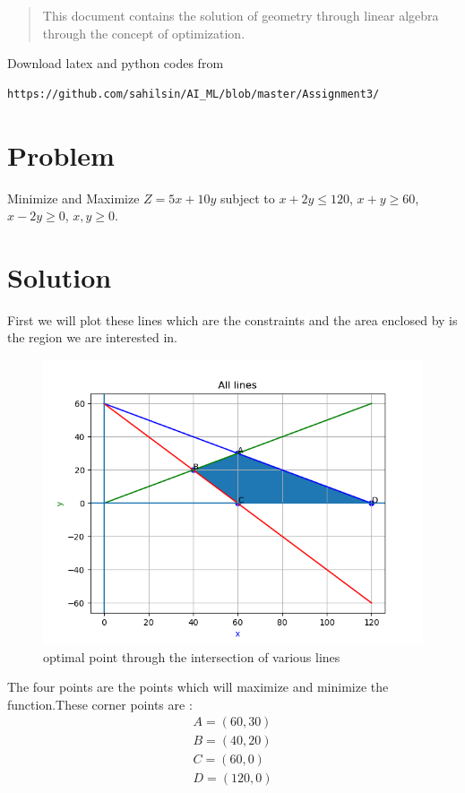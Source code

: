\begin{abstract}
This document contains the solution of geometry through linear algebra through the concept of optimization.
\end{abstract}
Download latex and python codes from 
\begin{lstlisting}
https://github.com/sahilsin/AI_ML/blob/master/Assignment3/
\end{lstlisting}
%
\section{Problem}
Minimize and Maximize $Z=5x+10y$ subject to $x+2y\leq120$, $x+y\geq60$, $x-2y\geq0$, $x,y\geq0$.\\
\section{Solution}

First we will plot these lines which are the constraints and the area enclosed by is the region we are interested in.

\begin{figure}[h]
\includegraphics[width=\columnwidth]{figs/Figure_1.png}
\caption{optimal point through the intersection of various lines}
\label{fig:Figure_1}
\end{figure}

The four points are the points which will maximize and minimize the function.These corner points are :
\begin{align*}
    A=(60,30)
\\
    B=(40,20)
\\
    C=(60,0)
\\
    D=(120,0)
\end{align*}

